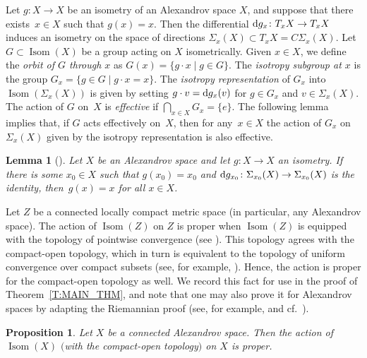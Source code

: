 \documentclass[pdftex]{sigma}
\numberwithin{equation}{section}
\newtheorem{lem}[thm]{Lemma}
\newtheorem{prop}[thm]{Proposition}
\theoremstyle{definition}
\DeclareMathOperator{\Iso}{Isom}
\begin{document}
Let $g\colon X\to X$ be an isometry of an Alexandrov space $X$, and suppose that there exists~${x\in X}$ such that $g(x) = x$. Then the differential ${\rm d}g_x\colon T_x X\to T_x X$ induces an isometry on the space of directions $\Sigma_x(X)\subset T_xX = C\Sigma_x(X)$. Let $G\subset \Iso(X)$ be a group acting on $X$ isometrically. Given $x\in X$, we define the \emph{orbit of $G$ through $x$} as $G(x) = \{g\cdot x\mid g\in G\}$. The \emph{isotropy subgroup at $x$} is the group $G_x = \{g\in G\mid g\cdot x = x\}$. The \emph{isotropy representation} of $G_x$ into $\Iso(\Sigma_x(X))$ is given by setting $g\cdot v = {\rm d} g_x(v)$ for $g\in G_x$ and $v\in \Sigma_x(X)$.
The action of $G$ on~$X$ is \emph{effective} if $\bigcap_{x\in X} G_x = \{e\}$. The following lemma implies that, if $G$ acts effectively on~$X$, then for any~${x\in X}$ the action of $G_x$ on $\Sigma_x(X)$ given by the isotropy representation is also effective.

\begin{lem}[]
\label{L: Isotropy action acts effectivelly}
Let $X$ be an Alexandrov space and let $g\colon X\to X$ an isometry. If there is some $x_0\in X$ such that $g(x_0)=x_0$ and ${\rm d}g_{x_0}\colon \Sigma_{x_0}(X)\to \Sigma_{x_0}(X)$ is the identity, then~${g(x)=x}$ for all $x\in X$.
\end{lem}

Let $Z$ be a connected locally compact metric space (in particular, any Alexandrov space).
The action of $\Iso(Z)$ on $Z$ is proper when $\Iso(Z)$ is equipped with the topology of pointwise convergence (see \cite[Proposition in Section 4, p.\ 11]{ManoussosStrantzalos2003}).
This topology agrees with the compact-open topology, which in turn is equivalent to the topology of uniform convergence over compact subsets (see, for example, \cite{Manoussos2010}).
Hence, the action is proper for the compact-open topology as well.
We record this fact for use in the proof of Theorem~\ref{T:MAIN_THM}, and note that one may also prove it for Alexandrov spaces by adapting the Riemannian proof (see, for example, \cite[Proposition~3.62]{AlexandrinoBettiol2015} and cf.\ \cite{DiazRamos2008a}).

\begin{prop}\label{P: Isometry group of Alex space acts properly}
Let $X$ be a connected Alexandrov space. Then the action of $\Iso(X)$ $($with the compact-open topology$)$ on $X$ is proper.
\end{prop}
\end{document}
